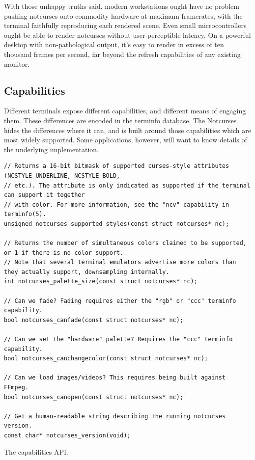 \documentclass[letterpaper,10pt]{article}
\begin{document}
With those unhappy truths said, modern workstations ought have no problem pushing
notcurses onto commodity hardware at maximum framerates, with the terminal
faithfully reproducing each rendered scene. Even small microcontrollers ought
be able to render notcurses without user-perceptible latency. On a powerful
desktop with non-pathological output, it's easy to render in excess of
ten thousand frames per second, far beyond the refresh capabilities of any
existing monitor.

\subsection{Capabilities}
Different terminals expose different capabilities, and different means of
engaging them. These differences are encoded in the terminfo database\cite{terminfo}.
The Notcurses hides the differences where it can, and is built around those
capabilities which are most widely supported. Some applications, however, will
want to know details of the underlying implementation.
\begin{listing}[!htb]
\begin{verbatim}
// Returns a 16-bit bitmask of supported curses-style attributes (NCSTYLE_UNDERLINE, NCSTYLE_BOLD,
// etc.). The attribute is only indicated as supported if the terminal can support it together
// with color. For more information, see the "ncv" capability in terminfo(5).
unsigned notcurses_supported_styles(const struct notcurses* nc);

// Returns the number of simultaneous colors claimed to be supported, or 1 if there is no color support.
// Note that several terminal emulators advertise more colors than they actually support, downsampling internally.
int notcurses_palette_size(const struct notcurses* nc);

// Can we fade? Fading requires either the "rgb" or "ccc" terminfo capability.
bool notcurses_canfade(const struct notcurses* nc);

// Can we set the "hardware" palette? Requires the "ccc" terminfo capability.
bool notcurses_canchangecolor(const struct notcurses* nc);

// Can we load images/videos? This requires being built against FFmpeg.
bool notcurses_canopen(const struct notcurses* nc);

// Get a human-readable string describing the running notcurses version.
const char* notcurses_version(void);
\end{verbatim}
\caption{The capabilities API.}
\end{listing}
\end{document}
